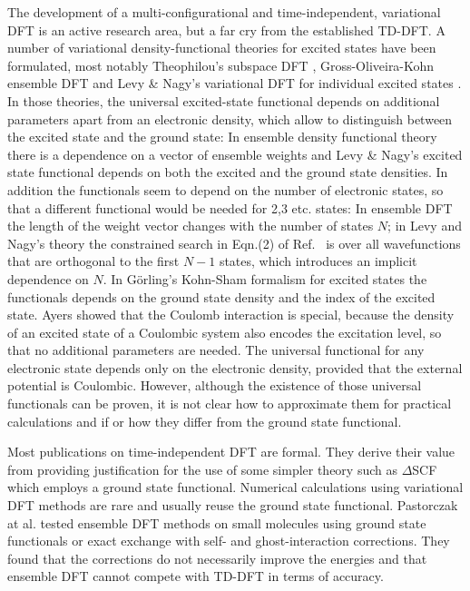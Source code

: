 \documentclass[journal=jpclcd,manuscript=letter]{achemso}
\begin{document}
The development of a multi-configurational and time-independent, variational DFT is an active research area,
but a far cry from the established TD-DFT.
A number of variational density-functional theories for excited states have been formulated, most notably
Theophilou's subspace DFT \cite{Theophilou1979}, Gross-Oliveira-Kohn ensemble DFT \cite{Gross1988ReyleighRitz} and
Levy \& Nagy's variational DFT for individual excited states \cite{Levy1999}.
In those theories, the universal excited-state functional depends on additional parameters apart from an electronic density,
which allow to distinguish between the excited state and the ground state: In ensemble density functional theory
\cite{Gross1988ReyleighRitz,Gross1988EnsembleDFT} there is a dependence on a vector of ensemble weights
and Levy \& Nagy's excited state functional \cite{Levy1999} depends on both the excited and the ground state densities.
In addition the functionals seem to depend on
the number of electronic states, so that a different functional would be needed for 2,3 etc. states:
In ensemble DFT the length of the weight vector changes with the number of states $N$;
in Levy and Nagy's theory the constrained search in Eqn.(2) of Ref.~\cite{Levy1999} is over all wavefunctions that are orthogonal
to the first $N-1$ states, which introduces an implicit dependence on $N$.
In G\"{o}rling's Kohn-Sham formalism for excited states the functionals
depends on the ground state density and the index of the excited state. \cite{Goerling1996density}
Ayers showed that the Coulomb interaction is special, because the density of an excited state of a Coulombic system also encodes
the excitation level, so that no additional parameters are needed. \cite{Ayers2012} The universal functional for
any electronic state depends only on the electronic density, provided that the external potential is Coulombic. \cite{Ayers2012}
However, although the existence of those universal functionals can be proven,
it is not clear how to approximate them for practical calculations
and if or how they differ from the ground state functional.


Most publications on time-independent DFT are formal. They derive their value from providing justification for
the use of some simpler theory such as $\Delta$SCF which employs a ground state functional.
Numerical calculations using variational DFT methods are rare and usually reuse the ground state functional.
Pastorczak at al. tested ensemble DFT methods on small molecules using ground state functionals or exact exchange
with self- and ghost-interaction corrections. \cite{Pastorczak2014} They found that the corrections
do not necessarily improve the energies and that ensemble DFT cannot compete with TD-DFT in terms of accuracy. \cite{Pastorczak2014}
\end{document}

